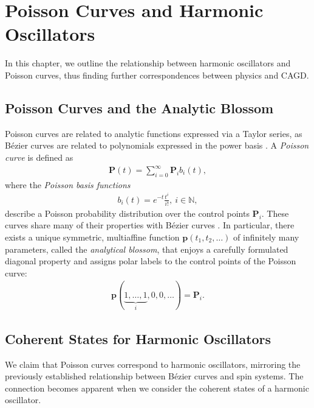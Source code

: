 \documentclass[12pt,final,3p]{elsarticle}
\begin{document}
\section{Poisson Curves  and Harmonic Oscillators}\label{sec:poisson_osc}
In this chapter, we outline the relationship between harmonic oscillators and Poisson curves, thus finding further correspondences between physics and CAGD.
\subsection{Poisson Curves and the Analytic Blossom}
Poisson curves are related to analytic functions expressed via a Taylor series, as B\'{e}zier curves are related to polynomials expressed in the power basis \cite{morin2000subdivision,morin2002analytic}. A \emph{Poisson curve} is defined as
\begin{align}
\mathbf{P}(t) = \sum_{i = 0}^{\infty}\mathbf{P}_{i}b_{i}(t),
\end{align} 
where the \emph{Poisson basis functions} 
\begin{align}\label{eq:poisson_basis}
b_{i}(t) = e^{-t}\frac{t^{i}}{i!},\ i \in \mathbb{N},
\end{align}
describe a Poisson probability distribution over the control points $\mathbf{P}_{i}$. These curves share many of their properties with B\'{e}zier curves \cite{morin2002analytic}. In particular, there exists a unique symmetric, multiaffine function $\mathbf{p}(t_{1}, t_{2}, \ldots)$ of infinitely many parameters, called the \emph{analytical blossom}, that enjoys a carefully formulated diagonal property \cite{morin2002analytic,goldman2002affine} and assigns polar labels to the control points of the Poisson curve:
\begin{align}
\mathbf{p}(\underbrace{1, \ldots, 1}_{i}, 0, 0,  \ldots) = \mathbf{P}_{i}.
\end{align}

\subsection{Coherent States for Harmonic Oscillators}
We claim that Poisson curves correspond to harmonic oscillators, mirroring the previously established relationship between B\'{e}zier curves and spin systems. The connection becomes apparent when we consider the coherent states of a harmonic oscillator. 
\end{document}
